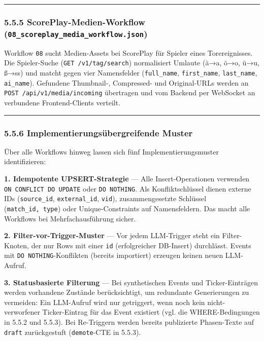 \begin{center}\rule{0.5\linewidth}{0.5pt}\end{center}

\subsubsection{\texorpdfstring{5.5.5 ScorePlay-Medien-Workflow
(\texttt{08\_scoreplay\_media\_workflow.json})}{5.5.5 ScorePlay-Medien-Workflow (08\_scoreplay\_media\_workflow.json)}}\label{scoreplay-medien-workflow-08_scoreplay_media_workflow.json}

Workflow \texttt{08} sucht Medien-Assets bei ScorePlay für Spieler eines
Torereignisses. Die Spieler-Suche (\texttt{GET\ /v1/tag/search})
normalisiert Umlaute (ä→a, ö→o, ü→u, ß→ss) und matcht gegen vier
Namensfelder (\texttt{full\_name}, \texttt{first\_name},
\texttt{last\_name}, \texttt{ai\_name}). Gefundene Thumbnail-,
Compressed- und Original-URLs werden an
\texttt{POST\ /api/v1/media/incoming} übertragen und vom Backend per
WebSocket an verbundene Frontend-Clients verteilt.

\begin{center}\rule{0.5\linewidth}{0.5pt}\end{center}

\subsubsection{5.5.6 Implementierungsübergreifende
Muster}\label{implementierungsuxfcbergreifende-muster}

Über alle Workflows hinweg lassen sich fünf Implementierungsmuster
identifizieren:

\textbf{1. Idempotente UPSERT-Strategie} --- Alle Insert-Operationen
verwenden \texttt{ON\ CONFLICT\ DO\ UPDATE} oder \texttt{DO\ NOTHING}.
Als Konfliktschlüssel dienen externe IDs (\texttt{source\_id},
\texttt{external\_id}, \texttt{vid}), zusammengesetzte Schlüssel
(\texttt{match\_id,\ type}) oder Unique-Constraints auf Namensfeldern.
Das macht alle Workflows bei Mehrfachausführung sicher.

\textbf{2. Filter-vor-Trigger-Muster} --- Vor jedem LLM-Trigger steht
ein Filter-Knoten, der nur Rows mit einer \texttt{id} (erfolgreicher
DB-Insert) durchlässt. Events mit \texttt{DO\ NOTHING}-Konflikten
(bereits importiert) erzeugen keinen neuen LLM-Aufruf.

\textbf{3. Statusbasierte Filterung} --- Bei synthetischen Events und
Ticker-Einträgen werden vorhandene Zustände berücksichtigt, um
redundante Generierungen zu vermeiden: Ein LLM-Aufruf wird nur
getriggert, wenn noch kein nicht-verworfener Ticker-Eintrag für das
Event existiert (vgl. die WHERE-Bedingungen in 5.5.2 und 5.5.3). Bei
Re-Triggern werden bereits publizierte Phasen-Texte auf \texttt{draft}
zurückgestuft (\texttt{demote}-CTE in 5.5.3).

